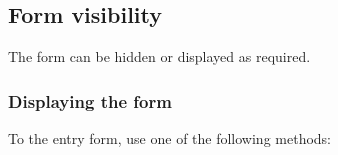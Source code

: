 \subsection{Form visibility\label{transactions-form-exposure}}

The form can be hidden or displayed as required.


\subsubsection{Displaying the form\label{transactions-form-exposure-display}}

To  the entry form, use one of the following methods:

